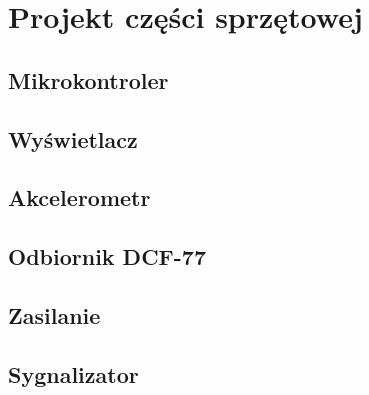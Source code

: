 \chapter{Projekt części sprzętowej}

\nocite{nRF52832PS,MDBT42Q,LIS3DH,SSD1680,DCF1060N,MCP73831,AP2112K,WITWytyczneSI}

\section{Mikrokontroler}

\section{Wyświetlacz}

\section{Akcelerometr}

\section{Odbiornik DCF-77}

\section{Zasilanie}

\section{Sygnalizator}
